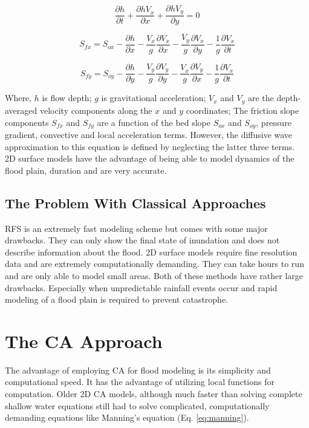 \begin{equation}
	\label{eq:3.1}
	\frac{\partial h}{\partial t} + \frac{\partial h V_{x}}{\partial x} + \frac{\partial h V_{y}}{\partial y} = 0
\end{equation}

\begin{equation}
	\label{eq:3.2}
	S_{fx} = S_{ox} - \frac{\partial h}{\partial x} - \frac{V_{x}}{g}\frac{\partial V_{x}}{\partial x} - \frac{V_{y}}{g}\frac{\partial V_{x}}{\partial y} - \frac{1}{g}\frac{\partial V_{x}}{\partial t} 
\end{equation}

\begin{equation}
	\label{eq:3.3}
	S_{fy} = S_{oy} - \frac{\partial h}{\partial y} - \frac{V_{y}}{g}\frac{\partial V_{y}}{\partial y} - \frac{V_{x}}{g}\frac{\partial V_{y}}{\partial x} - \frac{1}{g}\frac{\partial V_{x}}{\partial t} 
\end{equation}

Where, $h$ is flow depth; $g$ is gravitational acceleration; $V_{x}$ and $V_{y}$ are the depth-averaged  velocity components along the $x$ and $y$ coordinates; The friction slope components $S_{fx}$ and $S_{fy}$ are a function of the bed slope $S_{ox}$ and $S_{oy}$, pressure gradient, convective and local acceleration terms. However, the diffusive wave approximation to this equation is defined by neglecting the latter three terms. \\
2D surface models have the advantage of being able to model dynamics of the flood plain, duration and are very accurate.
 
\subsection*{The Problem With Classical Approaches}
RFS is an extremely fast modeling scheme but comes with some major drawbacks. They can only show the final state of inundation and does not describe information about the flood. 2D surface models require fine resolution data and are extremely computationally demanding. They can take hours to run and are only able to model small areas. Both of these methods have rather large drawbacks. Especially when unpredictable rainfall events occur and rapid modeling of a flood plain is required to prevent catastrophe. 

\section{The CA Approach}
\label{WCA2D}
The advantage of employing CA for flood modeling is its simplicity \cite{Wolfram2002} and computational speed. It has the advantage of utilizing local functions for computation. Older 2D CA models, although much faster than solving complete shallow water equations still had to solve complicated, computationally demanding equations like Manning's equation (Eq. \ref{eq:manning}).

